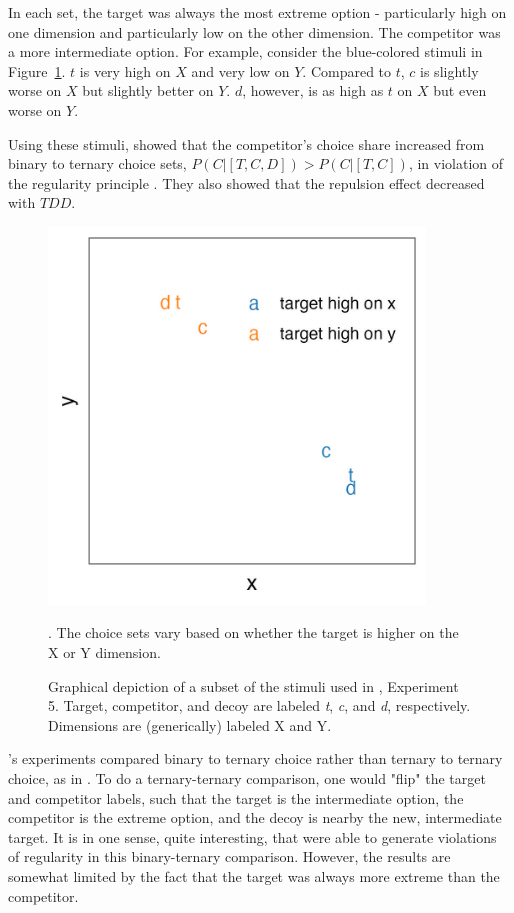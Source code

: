 In each set, the target was always the most extreme option - particularly high on one dimension and particularly low on the other dimension. The competitor was a more intermediate option. For example, consider the blue-colored stimuli in Figure~\ref{fig:banerjee_stim}. $t$ is very high on $X$ and very low on $Y$. Compared to $t$, $c$ is slightly worse on $X$ but slightly better on $Y$. $d$, however, is as high as $t$ on $X$ but even worse on $Y$. 

Using these stimuli, \textcite{banerjeeFactorsThatPromote2024} showed that the competitor's choice share increased from binary to ternary choice sets, $P(C|[T,C,D])>P(C|[T,C])$, in violation of the regularity principle \parencite{marley1989random}. They also showed that the repulsion effect decreased with $TDD$.

\begin{figure}
    \includegraphics[width=100mm]{figures/banerjee_stim.jpeg}
    \caption{Graphical depiction of a subset of the stimuli used in \textcite{banerjeeFactorsThatPromote2024}, Experiment 5. Target, competitor, and decoy are labeled \textit{t}, \textit{c}, and \textit{d}, respectively. Dimensions are (generically) labeled X and Y.}. The choice sets vary based on whether the target is higher on the X or Y dimension.
    \label{fig:banerjee_stim}
\end{figure}

\textcite{banerjeeFactorsThatPromote2024}'s experiments compared binary to ternary choice rather than ternary to ternary choice, as in \textcite{spektorWhenGoodLooks2018b}. To do a ternary-ternary comparison, one would "flip" the target and competitor labels, such that the target is the intermediate option, the competitor is the extreme option, and the decoy is nearby the new, intermediate target. It is in one sense, quite interesting, that \textcite{banerjeeFactorsThatPromote2024} were able to generate violations of regularity in this binary-ternary comparison. However, the results are somewhat limited by the fact that the target was always more extreme than the competitor.

